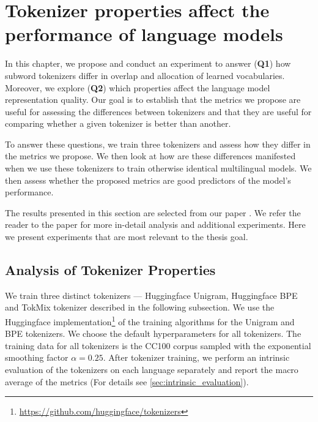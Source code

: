\chapter{Tokenizer properties affect the performance of language models}
\label{chap:experiment_1_validity}


In this chapter, we propose and conduct an experiment to answer (\textbf{Q1}) how subword tokenizers differ in overlap and allocation of learned vocabularies. Moreover, we explore (\textbf{Q2}) which properties affect the language model representation quality. Our goal is to establish that the metrics we propose are useful for assessing the differences between tokenizers and that they are useful for comparing whether a given tokenizer is better than another.

To answer these questions, we train three tokenizers and assess how they differ in the metrics we propose. We then look at how are these differences manifested when we use these tokenizers to train otherwise identical multilingual models. We then assess whether the proposed metrics are good predictors of the model's performance.  

The results presented in this section are selected from our paper \citet{limisiewicz_tokenization_2023}. We refer the reader to the paper for more in-detail analysis and additional experiments. Here we present experiments that are most relevant to the thesis goal.

\section{Analysis of Tokenizer Properties}

We train three distinct tokenizers --- Huggingface Unigram, Huggingface BPE and TokMix tokenizer \cite{limisiewicz_tokenization_2023} described in the following subsection. We use the Huggingface implementation\footnote{\href{https://github.com/huggingface/tokenizers}{https://github.com/huggingface/tokenizers}} of the training algorithms for the Unigram and BPE tokenizers. We choose the default hyperparameters for all tokenizers. The training data for all tokenizers is the CC100 corpus sampled with the exponential smoothing factor $\alpha=0.25$.
After tokenizer training, we perform an intrinsic evaluation of the tokenizers on each language separately and report the macro average of the metrics (For details see \autoref{sec:intrinsic_evaluation}).

